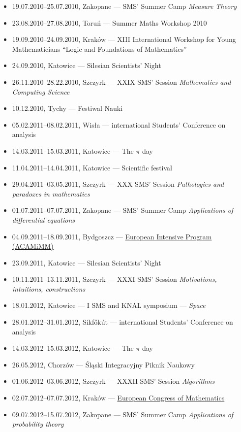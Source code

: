 \begin{itemize}
  \item 19.07.2010--25.07.2010, Zakopane ---  SMS' Summer Camp \textsl{Measure Theory}
  \item 23.08.2010--27.08.2010, Toruń --- Summer Maths Workshop 2010
  \item 19.09.2010--24.09.2010, Kraków --- XIII International Workshop for Young Mathematicians ``Logic and Foundations of Mathematics''
  \item 24.09.2010, Katowice --- Silesian Scientists' Night
  \item 26.11.2010--28.22.2010, Szczyrk --- XXIX SMS' Session \textsl{Mathematics and Computing Science}
  \item 10.12.2010, Tychy --- Festiwal Nauki
  \item 05.02.2011--08.02.2011, Wisła ---  international Students' Conference on analysis
  \item 14.03.2011--15.03.2011, Katowice --- The $\pi$ day
  \item 11.04.2011--14.04.2011, Katowice --- Scientific festival
  \item 29.04.2011--03.05.2011, Szczyrk --- XXX SMS' Session \textsl{Pathologies and paradoxes in mathematics}
  \item 01.07.2011--07.07.2011, Zakopane ---  SMS' Summer Camp \textsl{Applications of differential equations}
  \item 04.09.2011--18.09.2011, Bydgoszcz --- \href{\urlAcamimm}{European Intensive Program (ACAMiMM)}
  \item 23.09.2011, Katowice --- Silesian Scientists' Night
  \item 10.11.2011--13.11.2011, Szczyrk --- XXXI SMS' Session \textsl{Motivations, intuitions, constructions}
  \item 18.01.2012, Katowice --- I SMS and KNAL symposium --- \textsl{Space}
  \item 28.01.2012--31.01.2012, Síkfőkút ---  international Students' Conference on analysis
  \item 14.03.2012--15.03.2012, Katowice --- The $\pi$ day
  \item 26.05.2012, Chorzów --- Śląski Integracyjny Piknik Naukowy
  \item 01.06.2012--03.06.2012, Szczyrk --- XXXII SMS' Session \textsl{Algorithms}
  \item 02.07.2012--07.07.2012, Kraków --- \href{http://www.6ecm.pl/en/news/42/Photos-from-the-6ECM}{ European Congress of Mathematics}
  \item 09.07.2012--15.07.2012, Zakopane ---  SMS' Summer Camp \textsl{Applications of probability theory}

\end{itemize}
